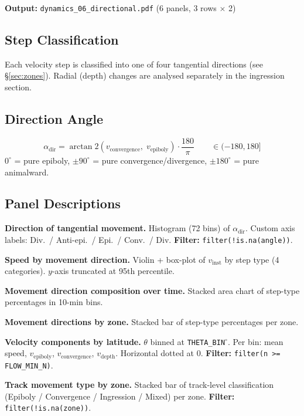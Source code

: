 \documentclass[11pt,a4paper]{article}
\newcommand{\param}[1]{\texttt{#1}}
\begin{document}
\noindent\textbf{Output:} \texttt{dynamics\_06\_directional.pdf}
(6 panels, 3 rows $\times$ 2)

\subsection*{Step Classification}

Each velocity step is classified into one of four tangential directions
(see \S\ref{sec:zones}).  Radial (depth) changes are analysed separately
in the ingression section.

\subsection*{Direction Angle}
\[
  \alpha_\mathrm{dir} = \arctan2(v_\mathrm{convergence},\;v_\mathrm{epiboly})
  \cdot \frac{180}{\pi}
  \qquad \in (-180,180]
\]
$0^\circ$ = pure epiboly, $\pm 90^\circ$ = pure convergence/divergence,
$\pm 180^\circ$ = pure animalward.

\subsection*{Panel Descriptions}

\begin{description}[style=nextline,leftmargin=1.5cm]
  \item[06a] \textbf{Direction of tangential movement.}
    Histogram (72 bins) of $\alpha_\mathrm{dir}$.  Custom axis labels:
    Div.\ / Anti-epi.\ / Epi.\ / Conv.\ / Div.
    \textbf{Filter:} \texttt{filter(!is.na(angle))}.

  \item[06b] \textbf{Speed by movement direction.}
    Violin + box-plot of $v_\mathrm{inst}$ by step type (4 categories).
    $y$-axis truncated at 95th percentile.

  \item[06c] \textbf{Movement direction composition over time.}
    Stacked area chart of step-type percentages in 10-min bins.

  \item[06d] \textbf{Movement directions by zone.}
    Stacked bar of step-type percentages per zone.

  \item[06e] \textbf{Velocity components by latitude.}
    $\theta$ binned at \param{THETA\_BIN}$^\circ$.  Per bin: mean speed,
    $v_\mathrm{epiboly}$, $v_\mathrm{convergence}$, $v_\mathrm{depth}$.
    Horizontal dotted at 0.
    \textbf{Filter:} \texttt{filter(n >= FLOW\_MIN\_N)}.

  \item[06f] \textbf{Track movement type by zone.}
    Stacked bar of track-level classification (Epiboly / Convergence /
    Ingression / Mixed) per zone.
    \textbf{Filter:} \texttt{filter(!is.na(zone))}.
\end{description}
\end{document}
